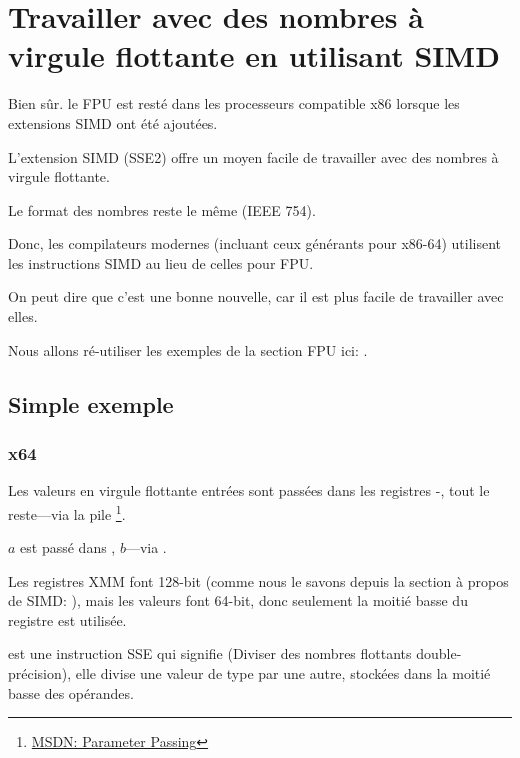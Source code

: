 \section{Travailler avec des nombres à virgule flottante en utilisant SIMD}

\label{floating_SIMD}

Bien sûr. le \ac{FPU} est resté dans les processeurs compatible x86 lorsque les extensions
\ac{SIMD} ont été ajoutées.

L'extension \ac{SIMD} (SSE2) offre un moyen facile de travailler avec des nombres
à virgule flottante.

Le format des nombres reste le même (IEEE 754).

Donc, les compilateurs modernes (incluant ceux générants pour x86-64) utilisent les
instructions \ac{SIMD} au lieu de celles pour FPU.

On peut dire que c'est une bonne nouvelle, car il est plus facile de travailler avec
elles.

Nous allons ré-utiliser les exemples de la section FPU ici: .

\subsection{Simple exemple}



\subsubsection{x64}



Les valeurs en virgule flottante entrées sont passées dans les registres -,
tout le reste---via la pile
\footnote{\href{http://go.yurichev.com/17263}{MSDN: Parameter Passing}}.

$a$ est passé dans , $b$---via .

Les registres XMM font 128-bit (comme nous le savons depuis la section à propos de
\ac{SIMD}: ), mais les valeurs \Tdouble font 64-bit, donc seulement
la moitié basse du registre est utilisée.

 est une instruction SSE qui signifie  (Diviser des nombres flottants double-précision), elle divise
une valeur de type \Tdouble par une autre, stockées dans la moitié basse des opérandes.

